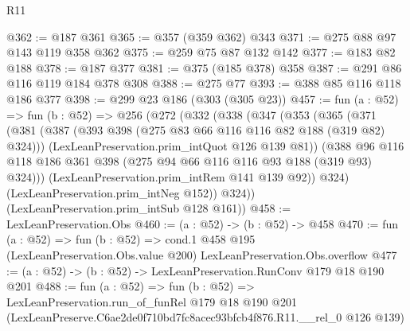 \begin{lexlean}{R11}
\begin{coremodule}
@362 := @187 @361
@365 := @357 (@359 @362) @343
@371 := @275 @88 @97 @143 @119 @358 @362
@375 := @259 @75 @87 @132 @142
@377 := @183 @82 @188
@378 := @187 @377
@381 := @375 (@185 @378) @358
@387 := @291 @86 @116 @119 @184 @378 @308
@388 := @275 @77
@393 := @388 @85 @116 @118 @186 @377
@398 := @299 @23 @186 (@303 (@305 @23))
@457 := fun (a : @52) =>
  fun (b : @52) =>
  @256
    (@272
      (@332
        (@338
          (@347
            (@353
              (@365
                (@371
                  (@381
                    (@387 (@393 @398 (@275 @83 @66 @116 @116 @82 @188 (@319 @82) @324)))
                    (LexLeanPreservation.prim_intQuot @126 @139 @81))
                  (@388
                    @96
                    @116
                    @118
                    @186
                    @361
                    @398
                    (@275 @94 @66 @116 @116 @93 @188 (@319 @93) @324)))
                (LexLeanPreservation.prim_intRem @141 @139 @92))
              @324)
            (LexLeanPreservation.prim_intNeg @152))
          @324))
      (LexLeanPreservation.prim_intSub @128 @161))
@458 := LexLeanPreservation.Obs
@460 := (a : @52) -> (b : @52) -> @458
@470 := fun (a : @52) =>
  fun (b : @52) =>
  cond.{1} @458 @195 (LexLeanPreservation.Obs.value @200) LexLeanPreservation.Obs.overflow
@477 := (a : @52) -> (b : @52) -> LexLeanPreservation.RunConv @179 @18 @190 @201
@488 := fun (a : @52) =>
  fun (b : @52) =>
  LexLeanPreservation.run_of_funRel
    @179
    @18
    @190
    @201
    (LexLeanPreserve.C6ae2de0f710bd7fc8acec93bfcb4f876.R11.__rel_0 @126 @139)
\end{coremodule}
\end{lexlean}
